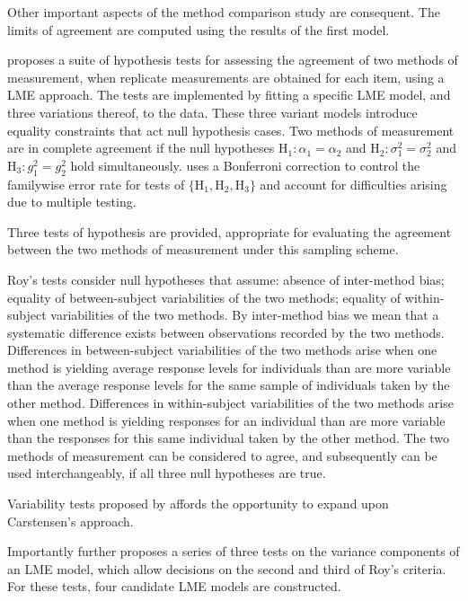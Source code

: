\documentclass[12pt, a4paper]{report}
\theoremstyle{plain}
\theoremstyle{definition}
\theoremstyle{remark}
\begin{document}
		Other important aspects of the method comparison study are consequent. The limits of agreement are computed using the results of the first model.
		
		\citet{ARoy2009} proposes a suite of hypothesis tests for assessing the agreement of two methods of measurement, when replicate measurements are obtained for each item, using a LME approach. The tests are implemented by fitting a specific LME model, and three variations thereof, to the data. These three variant models introduce equality constraints that act null hypothesis cases.
		Two methods of measurement are in complete agreement if the null hypotheses $\mathrm{H}_1\colon \alpha_1 = \alpha_2$ and $\mathrm{H}_2\colon \sigma^2_1 = \sigma^2_2 $ and $\mathrm{H}_3\colon g^2_1= g^2_2$ hold simultaneously. \citet{ARoy2009} uses a Bonferroni correction to control the familywise error rate for tests of $\{\mathrm{H}_1, \mathrm{H}_2, \mathrm{H}_3\}$ and account for difficulties arising due to multiple testing. 
		
		
		Three tests of hypothesis are provided, appropriate for evaluating the agreement between the two methods of measurement under this sampling scheme. 
		
		Roy's tests consider null hypotheses that assume: absence of inter-method bias; equality of between-subject variabilities of the two methods; equality of within-subject variabilities of the two methods. By inter-method bias we mean that a systematic difference exists between observations recorded by the two methods. Differences in between-subject variabilities of the two methods arise when one method is yielding average response levels for individuals than are more variable than the average response levels for the same sample of individuals taken by the other method.  Differences in within-subject variabilities of the two methods arise when one method is yielding responses for an individual than are more variable than the responses for this same individual taken by the other method. The two methods of measurement can be considered to agree, and subsequently can be used interchangeably, if all three null hypotheses are true.
		
		
	Variability tests proposed by \citet{ARoy2009} affords the opportunity to expand upon Carstensen's approach.
	
	
	Importantly \citet{ARoy2009} further proposes a series of three tests on the variance components of an LME model, which allow decisions on the second and third of Roy's criteria. For these tests, four candidate LME models are constructed. 
	
\end{document}
